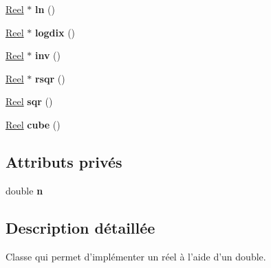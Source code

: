 \begin{DoxyCompactItemize}
\item 
\hypertarget{class_calcul_1_1_reel_ac196fa51cf2a7802c27945a8ecf0d84f}{\hyperlink{class_calcul_1_1_reel}{Reel} $\ast$ {\bfseries ln} ()}\label{class_calcul_1_1_reel_ac196fa51cf2a7802c27945a8ecf0d84f}

\item 
\hypertarget{class_calcul_1_1_reel_a1ccda276d9b0c5cd3a41017b99e72f95}{\hyperlink{class_calcul_1_1_reel}{Reel} $\ast$ {\bfseries logdix} ()}\label{class_calcul_1_1_reel_a1ccda276d9b0c5cd3a41017b99e72f95}

\item 
\hypertarget{class_calcul_1_1_reel_a343dcf27b4c579f1dbd377292e125a63}{\hyperlink{class_calcul_1_1_reel}{Reel} $\ast$ {\bfseries inv} ()}\label{class_calcul_1_1_reel_a343dcf27b4c579f1dbd377292e125a63}

\item 
\hypertarget{class_calcul_1_1_reel_a5fd6032ec5e7435733f9b14f4da12343}{\hyperlink{class_calcul_1_1_reel}{Reel} $\ast$ {\bfseries rsqr} ()}\label{class_calcul_1_1_reel_a5fd6032ec5e7435733f9b14f4da12343}

\item 
\hypertarget{class_calcul_1_1_reel_ae6d0c9ed443c23647efee077d5b3bcfd}{\hyperlink{class_calcul_1_1_reel}{Reel} {\bfseries sqr} ()}\label{class_calcul_1_1_reel_ae6d0c9ed443c23647efee077d5b3bcfd}

\item 
\hypertarget{class_calcul_1_1_reel_a9464cfe2dc6a89ff1eb98f504b200f43}{\hyperlink{class_calcul_1_1_reel}{Reel} {\bfseries cube} ()}\label{class_calcul_1_1_reel_a9464cfe2dc6a89ff1eb98f504b200f43}

\end{DoxyCompactItemize}
\subsection*{Attributs privés}
\begin{DoxyCompactItemize}
\item 
\hypertarget{class_calcul_1_1_reel_af4aae08ad6e2d0d3aae849105352ee1a}{double {\bfseries n}}\label{class_calcul_1_1_reel_af4aae08ad6e2d0d3aae849105352ee1a}

\end{DoxyCompactItemize}


\subsection{Description détaillée}
Classe qui permet d'implémenter un réel à l'aide d'un double. 

